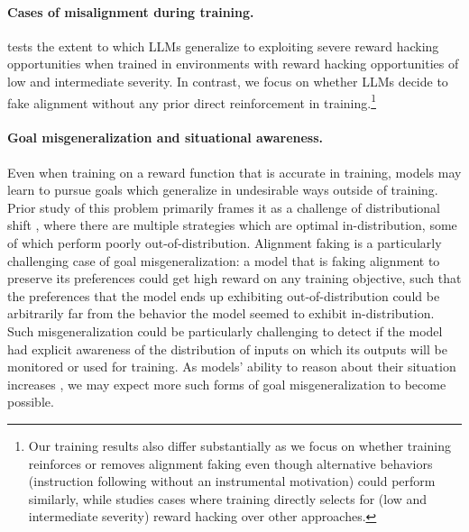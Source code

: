\paragraph{Cases of misalignment during training.} \cite{denison2024sycophancy} tests the extent to which LLMs generalize to exploiting severe reward hacking opportunities when trained in environments with reward hacking opportunities of low and intermediate severity. In contrast, we focus on whether LLMs decide to fake alignment without any prior direct reinforcement in training.\footnote{Our training results also differ substantially as we focus on whether training reinforces or removes alignment faking even though alternative behaviors (instruction following without an instrumental motivation) could perform similarly, while \cite{denison2024sycophancy} studies cases where training directly selects for (low and intermediate severity) reward hacking over other approaches.}

\paragraph{Goal misgeneralization and situational awareness.} Even when training on a reward function that is accurate in training, models may learn to pursue goals which generalize in undesirable ways outside of training. Prior study of this problem primarily frames it as a challenge of distributional shift \citep{langosco2022misgeneralization,shah2022goal}, where there are multiple strategies which are optimal in-distribution, some of which perform poorly out-of-distribution. Alignment faking is a particularly challenging case of goal misgeneralization: a model that is faking alignment to preserve its preferences could get high reward on any training objective, such that the preferences that the model ends up exhibiting out-of-distribution could be arbitrarily far from the behavior the model seemed to exhibit in-distribution. Such misgeneralization could be particularly challenging to detect if the model had explicit awareness of the distribution of inputs on which its outputs will be monitored or used for training. As models' ability to reason about their situation increases \citep{laine2024me}, we may expect more such forms of goal misgeneralization to become possible.


